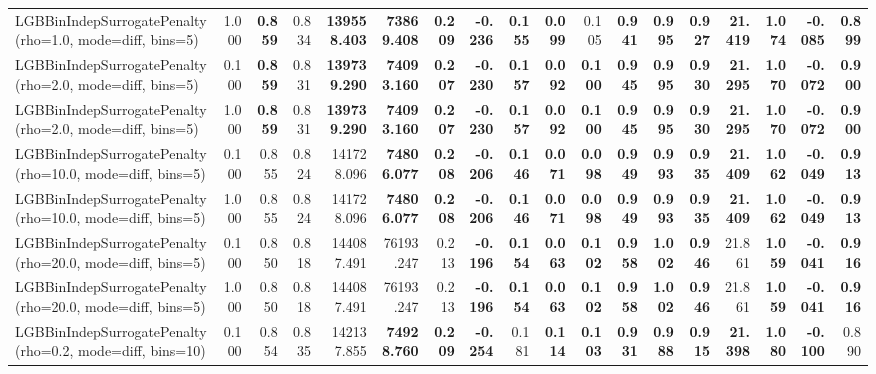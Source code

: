 \documentclass[11pt]{article}
\theoremstyle{plain}
\theoremstyle{definition}
\newcommand{\1}{\mathbf{1}}
\begin{document}
\begin{table}[htbp]
{\begin{tabular}{lrrrrrrrrrrrrrrrrr}
LGBBinIndepSurrogatePenalty(rho=1.0, mode=diff, bins=5) & 1.000 & \textbf{0.859} & 0.834 & \textbf{139558.403} & \textbf{73869.408} & \textbf{0.209} & \textbf{-0.236} & \textbf{0.155} & \textbf{0.099} & 0.105 & \textbf{0.941} & \textbf{0.995} & \textbf{0.927} & \textbf{21.419} & \textbf{1.074} & \textbf{-0.085} & \textbf{0.899} \\
LGBBinIndepSurrogatePenalty(rho=2.0, mode=diff, bins=5) & 0.100 & \textbf{0.859} & 0.831 & \textbf{139739.290} & \textbf{74093.160} & \textbf{0.207} & \textbf{-0.230} & \textbf{0.157} & \textbf{0.092} & \textbf{0.100} & \textbf{0.945} & \textbf{0.995} & \textbf{0.930} & \textbf{21.295} & \textbf{1.070} & \textbf{-0.072} & \textbf{0.900} \\
LGBBinIndepSurrogatePenalty(rho=2.0, mode=diff, bins=5) & 1.000 & \textbf{0.859} & 0.831 & \textbf{139739.290} & \textbf{74093.160} & \textbf{0.207} & \textbf{-0.230} & \textbf{0.157} & \textbf{0.092} & \textbf{0.100} & \textbf{0.945} & \textbf{0.995} & \textbf{0.930} & \textbf{21.295} & \textbf{1.070} & \textbf{-0.072} & \textbf{0.900} \\
LGBBinIndepSurrogatePenalty(rho=10.0, mode=diff, bins=5) & 0.100 & 0.855 & 0.824 & 141728.096 & \textbf{74806.077} & \textbf{0.208} & \textbf{-0.206} & \textbf{0.146} & \textbf{0.071} & \textbf{0.098} & \textbf{0.949} & \textbf{0.993} & \textbf{0.935} & \textbf{21.409} & \textbf{1.062} & \textbf{-0.049} & \textbf{0.913} \\
LGBBinIndepSurrogatePenalty(rho=10.0, mode=diff, bins=5) & 1.000 & 0.855 & 0.824 & 141728.096 & \textbf{74806.077} & \textbf{0.208} & \textbf{-0.206} & \textbf{0.146} & \textbf{0.071} & \textbf{0.098} & \textbf{0.949} & \textbf{0.993} & \textbf{0.935} & \textbf{21.409} & \textbf{1.062} & \textbf{-0.049} & \textbf{0.913} \\
LGBBinIndepSurrogatePenalty(rho=20.0, mode=diff, bins=5) & 0.100 & 0.850 & 0.818 & 144087.491 & 76193.247 & 0.213 & \textbf{-0.196} & \textbf{0.154} & \textbf{0.063} & \textbf{0.102} & \textbf{0.958} & \textbf{1.002} & \textbf{0.946} & 21.861 & \textbf{1.059} & \textbf{-0.041} & \textbf{0.916} \\
LGBBinIndepSurrogatePenalty(rho=20.0, mode=diff, bins=5) & 1.000 & 0.850 & 0.818 & 144087.491 & 76193.247 & 0.213 & \textbf{-0.196} & \textbf{0.154} & \textbf{0.063} & \textbf{0.102} & \textbf{0.958} & \textbf{1.002} & \textbf{0.946} & 21.861 & \textbf{1.059} & \textbf{-0.041} & \textbf{0.916} \\
LGBBinIndepSurrogatePenalty(rho=0.2, mode=diff, bins=10) & 0.100 & 0.854 & 0.835 & 142137.855 & \textbf{74928.760} & \textbf{0.209} & \textbf{-0.254} & 0.181 & \textbf{0.114} & \textbf{0.103} & \textbf{0.931} & \textbf{0.988} & \textbf{0.915} & \textbf{21.398} & \textbf{1.080} & \textbf{-0.100} & 0.890 \\

\end{tabular}}
\end{table}
\end{document}
